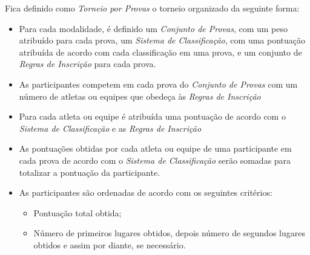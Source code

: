 \noindent
Fica definido como \textit{Torneio por Provas} o torneio organizado da seguinte forma:
\begin{itemize}[noitemsep]
	\item Para cada modalidade, é definido um \textit{Conjunto de Provas}, com um peso atribuído para cada prova, um \textit{Sistema de Classificação}, com uma pontuação atribuída de acordo com cada classificação em uma prova, e um conjunto de \textit{Regras de Inscrição} para cada prova.

	\item As participantes competem em cada prova do \textit{Conjunto de Provas} com um número de atletas ou equipes que obedeça às \textit{Regras de Inscrição} \item Para cada atleta ou equipe é atribuída uma pontuação de acordo com o \textit{Sistema de Classificação} e as \textit{Regras de Inscrição}

	\item As pontuações obtidas por cada atleta ou equipe de uma participante em cada prova de acordo com o \textit{Sistema de Classificação} serão somadas para totalizar a pontuação da participante.

	\item As participantes são ordenadas de acordo com os seguintes critérios:
	\begin{itemize}[noitemsep]
		\item Pontuação total obtida;
		\item Número de primeiros lugares obtidos, depois número de segundos lugares obtidos e assim por diante, se necessário.
	\end{itemize}
\end{itemize}
